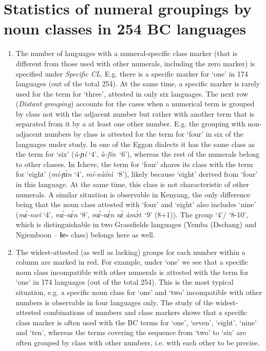 \normalsize 

\clearpage
\chapter{Statistics of numeral groupings by noun classes in 254 BC languages}


\begin{enumerate}
\item The number of languages with a numeral-specific class marker (that is different from those used with other numerals, including the zero marker) is specified under \textit{Specific} \textit{CL}. E.g. there is a specific marker for ‘one’ in 174 languages (out of the total 254). At the same time, a specific marker is rarely used for the term for ‘three’, attested in only six languages. The next row (\textit{Distant} \textit{grouping}) accounts for the cases when a numerical term is grouped by class not with the adjacent number but rather with another term that is separated from it by a at least one other number. E.g. the grouping with non-adjacent numbers by class is attested for the term for ‘four’ in six of the languages under study. In one of the Eggon dialects it has the same class as the term for ‘six’ (\textit{{\`{u}}-ɲí} ‘4’, \textit{{\`{u}}-fín}~‘6’), whereas the rest of the numerals belong to other classes. In Icheve, the term for ‘four’ shares its class with the term for ‘eight’ (\textit{mí-ɲ{\`{ɪ}}n} ‘4’, \textit{mí-n{\`{u}}ínì}~‘8’), likely because ‘eight’ derived from ‘four’ in this language. At the same time, this class is not characteristic of other numerals. A similar situation is observable in Kenyang, the only difference being that the noun class attested with ‘four’ and ‘eight’ also includes ‘nine’ (\textit{m{\'{ɛ}}-nw{\^{i}}} ‘4’, \textit{m{\'{ɛ}}-n{\`{ɛ}}n} ‘8’, \textit{m{\'{ɛ}}-n{\`{ɛ}}n} \textit{n{\`{ɛ}}} \textit{àm{\`{ɔ}}t}~‘9’ (8+1)). The group ‘4’/ ‘8-10’, which is distinguishable in two Grassfields languages (Yemba (Dschang) and Ngiemboon – \textbf{le-} class) belongs here as well. 

\item The widest-attested (as well as lacking) groups for each number within a column are marked in red. For example, under ‘one’ we see that a specific noun class  incompatible with other numerals is attested with the term for ‘one’ in 174 languages (out of the total 254). This is the most typical situation, e.g. a specific noun class for ‘one’ and ‘two’ incompatible with other numbers is observable in four languages only. The study of the widest-attested combinations of numbers and class markers shows that a specific class marker is often used with the BC terms for ‘one’, ‘seven’, ‘eight’, ‘nine’ and ‘ten’, whereas the terms covering the sequence from ‘two’ to ‘six’ are often grouped by class with other numbers, i.e. with each other to be precise.
\end{enumerate}


